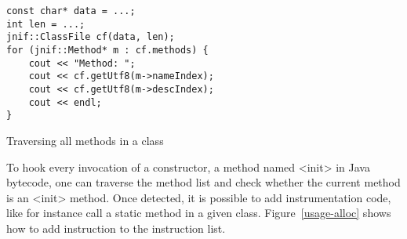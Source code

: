 \begin{listing}
\begin{verbatim}
const char* data = ...;
int len = ...;
jnif::ClassFile cf(data, len);
for (jnif::Method* m : cf.methods) {
	cout << "Method: ";
	cout << cf.getUtf8(m->nameIndex);
	cout << cf.getUtf8(m->descIndex);
	cout << endl;
}
\end{verbatim}
\caption{Traversing all methods in a class}
\label{usage-print}
\end{listing}

To hook every invocation of a constructor, a method named <init> in Java bytecode, 
one can traverse the method list and check whether the current method is an <init> method. 
Once detected, it is possible to add instrumentation code, like for instance call a static method in a given class. 
Figure~\ref{usage-alloc} shows how to add instruction to the instruction list.

